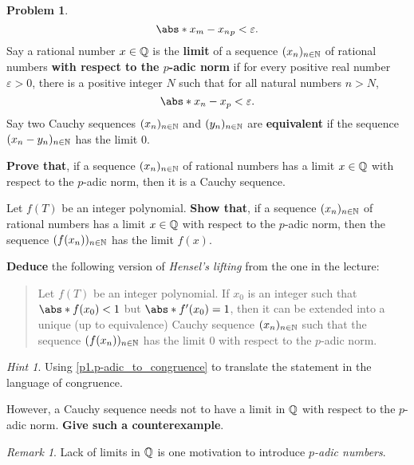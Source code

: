 \documentclass[11pt]{article}
\theoremstyle{plain}
\theoremstyle{definition}
\newtheorem{problem}{Problem}
\theoremstyle{remark}
\newtheorem*{remark}{Remark}
\newtheorem*{hint}{Hint}
\numberwithin{equation}{problem}
\begin{document}
\begin{problem}
	\[
		\abs*{x_m-x_n}_p<\varepsilon.
	\]
	Say a rational number $x\in\mathbb{Q}$ is the \textbf{limit} of a sequence $(x_n)_{n\in\mathbb{N}}$ of rational numbers \textbf{with respect to the $p$-adic norm} if for every positive real number $\varepsilon>0$, there is a positive integer $N$ such that for all natural numbers $n>N$,  
	\[
		\abs*{x_n-x}_p<\varepsilon.
	\]
	Say two Cauchy sequences $(x_n)_{n\in\mathbb{N}}$ and $(y_n)_{n\in\mathbb{N}}$ are \textbf{equivalent} if the sequence $(x_n-y_n)_{n\in\mathbb{N}}$ has the limit $0$.
	\begin{listinprob}[resume]
		\item \textbf{Prove that}, if a sequence $(x_n)_{n\in\mathbb{N}}$ of rational numbers has a limit $x\in\mathbb{Q}$ with respect to the $p$-adic norm, then it is a Cauchy sequence.
		\item Let $f(T)$ be an integer polynomial. \textbf{Show that}, if a sequence $(x_n)_{n\in\mathbb{N}}$ of rational numbers has a limit $x\in\mathbb{Q}$ with respect to the $p$-adic norm, then the sequence $(f(x_n))_{n\in\mathbb{N}}$ has the limit $f(x)$.
		\item \textbf{Deduce} the following version of \emph{Hensel's lifting} from the one in the lecture:
		\begin{quote}
			Let $f(T)$ be an integer polynomial. 
			If $x_0$ is an integer such that $\abs*{f(x_0)}<1$ but $\abs*{f'(x_0)}=1$, then it can be extended into a unique (up to equivalence) Cauchy sequence $(x_n)_{n\in\mathbb{N}}$ such that the sequence $(f(x_n))_{n\in\mathbb{N}}$ has the limit $0$ with respect to the $p$-adic norm. 
		\end{quote} 
		\begin{hint}
			Using \cref{p1.p-adic_to_congruence} to translate the statement in the language of congruence.
		\end{hint}
		\item However, a Cauchy sequence needs not to have a limit in $\mathbb{Q}$ with respect to the $p$-adic norm. 
		\textbf{Give such a counterexample}.
		\begin{remark}
			Lack of limits in $\mathbb{Q}$ is one motivation to introduce \emph{$p$-adic numbers}.
		\end{remark}
	\end{listinprob}
\end{problem}
\end{document}
